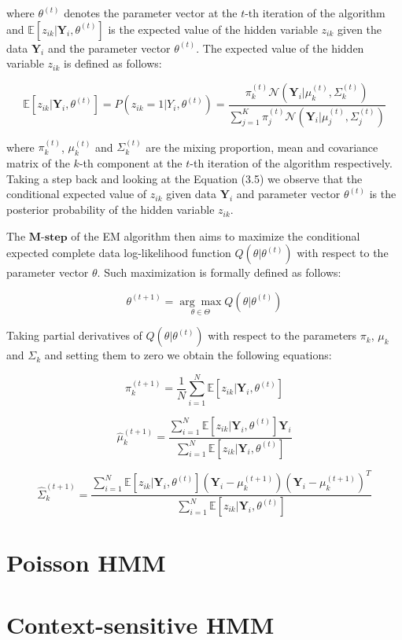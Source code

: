 where $\theta^{(t)}$ denotes the parameter vector at the $t$-th iteration of the algorithm and $\mathbb{E}[z_{ik}|\textbf{Y}_i,\theta^{(t)}]$ is the expected value of the hidden variable $z_{ik}$ given the data $\textbf{Y}_i$ and the parameter vector $\theta^{(t)}$.
The expected value of the hidden variable $z_{ik}$ is defined as follows:

\begin{equation} \label{eq:posterior_prob}
    \mathbb{E}[z_{ik}|\textbf{Y}_i,\theta^{(t)}] = P(z_{ik} = 1|Y_i,\theta^{(t)}) = \frac{\pi_k^{(t)} \mathcal{N}(\textbf{Y}_i|\mu_k^{(t)},\Sigma_k^{(t)})}{\sum_{j=1}^{K} \pi_j^{(t)} \mathcal{N}(\textbf{Y}_i|\mu_j^{(t)},\Sigma_j^{(t)})}
\end{equation}

where $\pi_k^{(t)}$, $\mu_k^{(t)}$ and $\Sigma_k^{(t)}$ are the mixing proportion, mean and covariance matrix of the $k$-th component at the $t$-th iteration of the algorithm respectively.
Taking a step back and looking at the Equation (3.5) we observe that the conditional expected value of $z_{ik}$ given data $\textbf{Y}_i$ 
and parameter vector $\theta^{(t)}$ is the posterior probability of the hidden variable $z_{ik}$.

The $\textbf{M-step}$ of the EM algorithm then aims to maximize the conditional expected complete data log-likelihood function $Q(\theta|\theta^{(t)})$ with respect to the parameter vector $\theta$.
Such maximization is formally defined as follows:

\begin{equation}
    \theta^{(t+1)} = \underset{\theta \in \Theta}{\arg\max} Q(\theta|\theta^{(t)})
\end{equation}

Taking partial derivatives of $Q(\theta|\theta^{(t)})$ with respect to the parameters $\pi_k$, $\mu_k$ and $\Sigma_k$ and setting them to zero we obtain the following equations:

\begin{equation}
    \hat{\pi}_k^{(t+1)} = \frac{1}{N} \sum_{i=1}^{N} \mathbb{E}[z_{ik}|\textbf{Y}_i,\theta^{(t)}]
\end{equation}

\begin{equation}
    \hat{\mu}_k^{(t+1)} = \frac{\sum_{i=1}^{N} \mathbb{E}[z_{ik}|\textbf{Y}_i,\theta^{(t)}] \textbf{Y}_i}{\sum_{i=1}^{N} \mathbb{E}[z_{ik}|\textbf{Y}_i,\theta^{(t)}]}
\end{equation}

\begin{equation}
    \hat{\Sigma}_k^{(t+1)} = \frac{\sum_{i=1}^{N} \mathbb{E}[z_{ik}|\textbf{Y}_i,\theta^{(t)}](\textbf{Y}_i - \mu_k^{(t+1)}){(\textbf{Y}_i - \mu_k^{(t+1)})}^T}{\sum_{i=1}^{N} \mathbb{E}[z_{ik}|\textbf{Y}_i,\theta^{(t)}]}
\end{equation}


\section{Poisson HMM}

\section{Context-sensitive HMM}